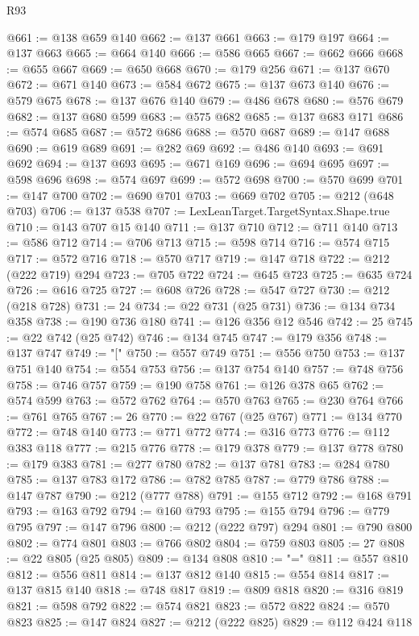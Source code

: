 \begin{lexlean}{R93}
\begin{coremodule}
@661 := @138 @659 @140
@662 := @137 @661
@663 := @179 @197
@664 := @137 @663
@665 := @664 @140
@666 := @586 @665
@667 := @662 @666
@668 := @655 @667
@669 := @650 @668
@670 := @179 @256
@671 := @137 @670
@672 := @671 @140
@673 := @584 @672
@675 := @137 @673 @140
@676 := @579 @675
@678 := @137 @676 @140
@679 := @486 @678
@680 := @576 @679
@682 := @137 @680 @599
@683 := @575 @682
@685 := @137 @683 @171
@686 := @574 @685
@687 := @572 @686
@688 := @570 @687
@689 := @147 @688
@690 := @619 @689
@691 := @282 @69
@692 := @486 @140
@693 := @691 @692
@694 := @137 @693
@695 := @671 @169
@696 := @694 @695
@697 := @598 @696
@698 := @574 @697
@699 := @572 @698
@700 := @570 @699
@701 := @147 @700
@702 := @690 @701
@703 := @669 @702
@705 := @212 (@648 @703)
@706 := @137 @538
@707 := LexLeanTarget.TargetSyntax.Shape.true
@710 := @143 @707 @15 @140
@711 := @137 @710
@712 := @711 @140
@713 := @586 @712
@714 := @706 @713
@715 := @598 @714
@716 := @574 @715
@717 := @572 @716
@718 := @570 @717
@719 := @147 @718
@722 := @212 (@222 @719) @294
@723 := @705 @722
@724 := @645 @723
@725 := @635 @724
@726 := @616 @725
@727 := @608 @726
@728 := @547 @727
@730 := @212 (@218 @728)
@731 := 24
@734 := @22 @731 (@25 @731)
@736 := @134 @734 @358
@738 := @190 @736 @180
@741 := @126 @356 @12 @546
@742 := 25
@745 := @22 @742 (@25 @742)
@746 := @134 @745
@747 := @179 @356
@748 := @137 @747
@749 := "["
@750 := @557 @749
@751 := @556 @750
@753 := @137 @751 @140
@754 := @554 @753
@756 := @137 @754 @140
@757 := @748 @756
@758 := @746 @757
@759 := @190 @758
@761 := @126 @378 @65
@762 := @574 @599
@763 := @572 @762
@764 := @570 @763
@765 := @230 @764
@766 := @761 @765
@767 := 26
@770 := @22 @767 (@25 @767)
@771 := @134 @770
@772 := @748 @140
@773 := @771 @772
@774 := @316 @773
@776 := @112 @383 @118
@777 := @215 @776
@778 := @179 @378
@779 := @137 @778
@780 := @179 @383
@781 := @277 @780
@782 := @137 @781
@783 := @284 @780
@785 := @137 @783 @172
@786 := @782 @785
@787 := @779 @786
@788 := @147 @787
@790 := @212 (@777 @788)
@791 := @155 @712
@792 := @168 @791
@793 := @163 @792
@794 := @160 @793
@795 := @155 @794
@796 := @779 @795
@797 := @147 @796
@800 := @212 (@222 @797) @294
@801 := @790 @800
@802 := @774 @801
@803 := @766 @802
@804 := @759 @803
@805 := 27
@808 := @22 @805 (@25 @805)
@809 := @134 @808
@810 := "="
@811 := @557 @810
@812 := @556 @811
@814 := @137 @812 @140
@815 := @554 @814
@817 := @137 @815 @140
@818 := @748 @817
@819 := @809 @818
@820 := @316 @819
@821 := @598 @792
@822 := @574 @821
@823 := @572 @822
@824 := @570 @823
@825 := @147 @824
@827 := @212 (@222 @825)
@829 := @112 @424 @118

\end{coremodule}
\end{lexlean}
